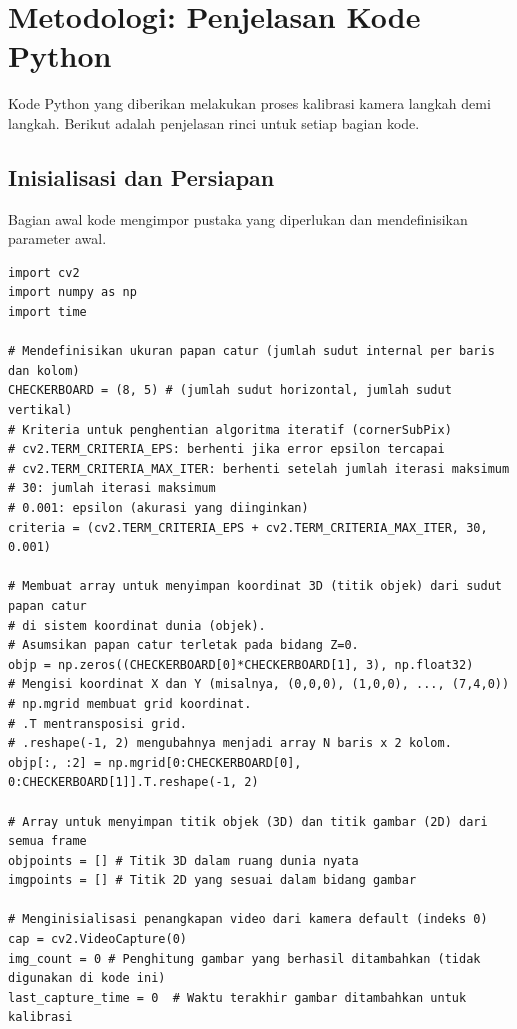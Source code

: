 \documentclass[12pt,a4paper]{article}
\begin{document}
\section{Metodologi: Penjelasan Kode Python}
Kode Python yang diberikan melakukan proses kalibrasi kamera langkah demi
langkah. Berikut adalah penjelasan rinci untuk setiap bagian kode.

\subsection{Inisialisasi dan Persiapan}
Bagian awal kode mengimpor pustaka yang diperlukan dan mendefinisikan parameter
awal.

\begin{lstlisting}[caption={Inisialisasi Pustaka dan Parameter}, label={lst:init}]
import cv2
import numpy as np
import time

# Mendefinisikan ukuran papan catur (jumlah sudut internal per baris dan kolom)
CHECKERBOARD = (8, 5) # (jumlah sudut horizontal, jumlah sudut vertikal)
# Kriteria untuk penghentian algoritma iteratif (cornerSubPix)
# cv2.TERM_CRITERIA_EPS: berhenti jika error epsilon tercapai
# cv2.TERM_CRITERIA_MAX_ITER: berhenti setelah jumlah iterasi maksimum
# 30: jumlah iterasi maksimum
# 0.001: epsilon (akurasi yang diinginkan)
criteria = (cv2.TERM_CRITERIA_EPS + cv2.TERM_CRITERIA_MAX_ITER, 30, 0.001)

# Membuat array untuk menyimpan koordinat 3D (titik objek) dari sudut papan catur
# di sistem koordinat dunia (objek).
# Asumsikan papan catur terletak pada bidang Z=0.
objp = np.zeros((CHECKERBOARD[0]*CHECKERBOARD[1], 3), np.float32)
# Mengisi koordinat X dan Y (misalnya, (0,0,0), (1,0,0), ..., (7,4,0))
# np.mgrid membuat grid koordinat.
# .T mentransposisi grid.
# .reshape(-1, 2) mengubahnya menjadi array N baris x 2 kolom.
objp[:, :2] = np.mgrid[0:CHECKERBOARD[0], 0:CHECKERBOARD[1]].T.reshape(-1, 2)

# Array untuk menyimpan titik objek (3D) dan titik gambar (2D) dari semua frame
objpoints = [] # Titik 3D dalam ruang dunia nyata
imgpoints = [] # Titik 2D yang sesuai dalam bidang gambar

# Menginisialisasi penangkapan video dari kamera default (indeks 0)
cap = cv2.VideoCapture(0)
img_count = 0 # Penghitung gambar yang berhasil ditambahkan (tidak digunakan di kode ini)
last_capture_time = 0  # Waktu terakhir gambar ditambahkan untuk kalibrasi
\end{lstlisting}
\end{document}
